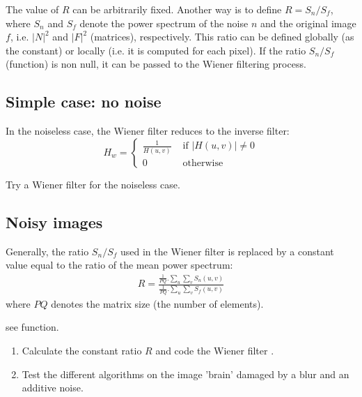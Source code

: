 The value of $R$ can be arbitrarily fixed. Another way is to define $R=S_n/S_f$, where $S_n$ and $S_f$ denote the power spectrum of the noise $n$ and the original image $f$, i.e. $|N|^2$ and $|F|^2$ (matrices), respectively. This ratio can be defined globally (as the constant) or locally (i.e. it is computed for each pixel). If the ratio $S_n/S_f$ (function) is non null, it can be passed to the Wiener filtering process.

\subsection{Simple case: no noise}

In the noiseless case, the Wiener filter reduces to the inverse filter:
$$
{H_w}=\left\{
\begin{array}{ll}
\displaystyle\frac{1}{H(u,v)}&\text{ if } |H(u,v)|\neq 0\\
0 & \text{ otherwise}
\end{array}
\right.
$$
\begin{qbox}
Try a Wiener filter for the noiseless case.
\end{qbox}

\subsection{Noisy images}

Generally, the ratio $S_n/S_f$ used in the Wiener filter is replaced by a constant value equal to the ratio of the mean power spectrum:
\begin{eqnarray}
R=\frac{\displaystyle\frac{1}{PQ}. \sum_u\sum_v S_n(u,v)}{\displaystyle\frac{1}{PQ}.\sum_u\sum_v S_f(u,v)}
\end{eqnarray}
where $PQ$ denotes the matrix size (the number of elements).

\begin{mcomment}
 \begin{mremark}
   see  function.
 \end{mremark}
\end{mcomment}

\begin{qbox}
\begin{enumerate}
	\item Calculate the constant ratio $R$ and code the Wiener filter .
	\item Test the different algorithms on the image 'brain' damaged by a blur and an additive noise.
\end{enumerate}
\end{qbox}


